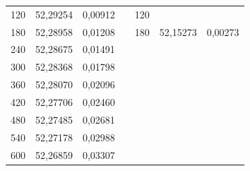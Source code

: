 \begin{table}[]
\begin{tabular}{ccccccc}
\multicolumn{1}{|c|}{120}         & \multicolumn{1}{c|}{52,29254} & \multicolumn{1}{c|}{0,00912}        & \multicolumn{1}{c|}{} & \multicolumn{1}{c|}{120}         & \multicolumn{1}{c|}{}         & \multicolumn{1}{c|}{}               \\ \cline{1-3} \cline{5-7} 
\multicolumn{1}{|c|}{180}         & \multicolumn{1}{c|}{52,28958} & \multicolumn{1}{c|}{0,01208}        & \multicolumn{1}{c|}{} & \multicolumn{1}{c|}{180}         & \multicolumn{1}{c|}{52,15273} & \multicolumn{1}{c|}{0,00273}        \\ \cline{1-3} \cline{5-7} 
\multicolumn{1}{|c|}{240}         & \multicolumn{1}{c|}{52,28675} & \multicolumn{1}{c|}{0,01491}        & \multicolumn{1}{c|}{} & \multicolumn{1}{c|}{}            & \multicolumn{1}{c|}{}         & \multicolumn{1}{c|}{}               \\ \cline{1-3} \cline{5-7} 
\multicolumn{1}{|c|}{300}         & \multicolumn{1}{c|}{52,28368} & \multicolumn{1}{c|}{0,01798}        & \multicolumn{1}{c|}{} & \multicolumn{1}{c|}{}            & \multicolumn{1}{c|}{}         & \multicolumn{1}{c|}{}               \\ \cline{1-3} \cline{5-7} 
\multicolumn{1}{|c|}{360}         & \multicolumn{1}{c|}{52,28070} & \multicolumn{1}{c|}{0,02096}        & \multicolumn{1}{c|}{} & \multicolumn{1}{c|}{}            & \multicolumn{1}{c|}{}         & \multicolumn{1}{c|}{}               \\ \cline{1-3} \cline{5-7} 
\multicolumn{1}{|c|}{420}         & \multicolumn{1}{c|}{52,27706} & \multicolumn{1}{c|}{0,02460}        & \multicolumn{1}{c|}{} & \multicolumn{1}{c|}{}            & \multicolumn{1}{c|}{}         & \multicolumn{1}{c|}{}               \\ \cline{1-3} \cline{5-7} 
\multicolumn{1}{|c|}{480}         & \multicolumn{1}{c|}{52,27485} & \multicolumn{1}{c|}{0,02681}        & \multicolumn{1}{c|}{} & \multicolumn{1}{c|}{}            & \multicolumn{1}{c|}{}         & \multicolumn{1}{c|}{}               \\ \cline{1-3} \cline{5-7} 
\multicolumn{1}{|c|}{540}         & \multicolumn{1}{c|}{52,27178} & \multicolumn{1}{c|}{0,02988}        & \multicolumn{1}{c|}{} & \multicolumn{1}{c|}{}            & \multicolumn{1}{c|}{}         & \multicolumn{1}{c|}{}               \\ \cline{1-3} \cline{5-7} 
\multicolumn{1}{|c|}{600}         & \multicolumn{1}{c|}{52,26859} & \multicolumn{1}{c|}{0,03307}        & \multicolumn{1}{c|}{} & \multicolumn{1}{c|}{}            & \multicolumn{1}{c|}{}         & \multicolumn{1}{c|}{}               \\ \cline{1-3} \cline{5-7} 
\end{tabular}
\end{table}

